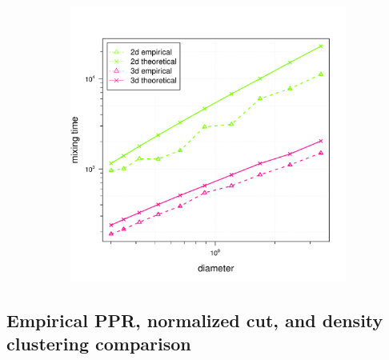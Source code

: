 \documentclass{article}
\newcommand{\1}{\mathbf{1}}
\theoremstyle{aldenthm}
\theoremstyle{aldenrmrk}
\begin{document}
\begin{figure}
\begin{adjustbox}{minipage=\linewidth,scale=0.8}
\begin{subfigure}{.33\linewidth}
		\caption{}
	\end{subfigure}
	\begin{subfigure}{.33\linewidth}
		\includegraphics[width=\linewidth]{example1plots/diameter_mixing_time_plot}
		\caption{}
	\end{subfigure}
	\end{adjustbox}
\end{figure}

\subsection{Empirical PPR, normalized cut, and density clustering comparison}
\end{document}
